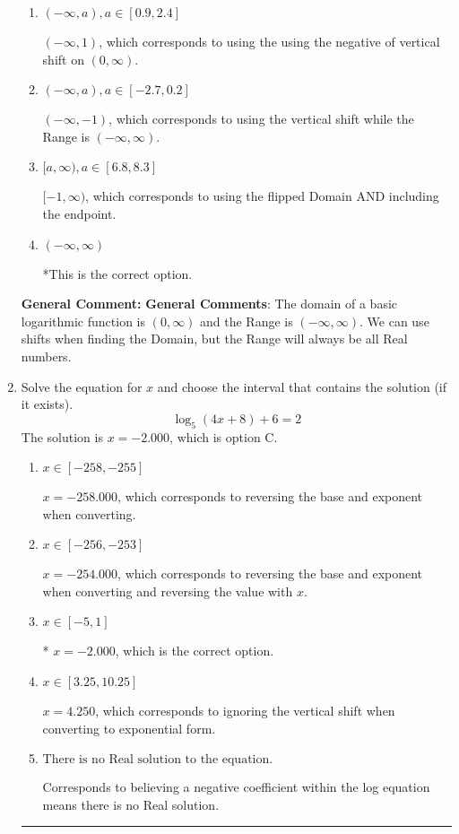 \documentclass{extbook}[14pt]
\newcommand{\litem}[1]{\item #1

\rule{\textwidth}{0.4pt}}
\begin{document}
\begin{enumerate}
{\begin{enumerate}[label=\Alph*.]
$[-7, \infty)$, which corresponds to using the negative of the horizontal shift AND including the endpoint.
\item \( (-\infty, a), a \in [0.9, 2.4] \)

$(-\infty, 1)$, which corresponds to using the using the negative of vertical shift on $(0, \infty)$.
\item \( (-\infty, a), a \in [-2.7, 0.2] \)

$(-\infty, -1)$, which corresponds to using the vertical shift while the Range is $(-\infty, \infty)$.
\item \( [a, \infty), a \in [6.8, 8.3] \)

$[-1, \infty)$, which corresponds to using the flipped Domain AND including the endpoint.
\item \( (-\infty, \infty) \)

*This is the correct option.
\end{enumerate}

\textbf{General Comment:} \textbf{General Comments}: The domain of a basic logarithmic function is $(0, \infty)$ and the Range is $(-\infty, \infty)$. We can use shifts when finding the Domain, but the Range will always be all Real numbers.
}
\litem{
Solve the equation for $x$ and choose the interval that contains the solution (if it exists).
\[ \log_{5}{(4x+8)}+6 = 2 \]The solution is \( x = -2.000 \), which is option C.\begin{enumerate}[label=\Alph*.]
\item \( x \in [-258, -255] \)

$x = -258.000$, which corresponds to reversing the base and exponent when converting.
\item \( x \in [-256, -253] \)

$x = -254.000$, which corresponds to reversing the base and exponent when converting and reversing the value with $x$.
\item \( x \in [-5, 1] \)

* $x = -2.000$, which is the correct option.
\item \( x \in [3.25, 10.25] \)

$x = 4.250$, which corresponds to ignoring the vertical shift when converting to exponential form.
\item \( \text{There is no Real solution to the equation.} \)

Corresponds to believing a negative coefficient within the log equation means there is no Real solution.
\end{enumerate}

}
\end{enumerate}
\end{document}
